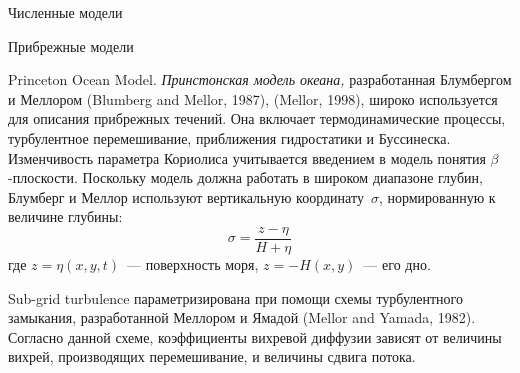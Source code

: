\begin{chapter}{Численные модели}
\begin{section}{Прибрежные модели}
\begin{paragraph}{Princeton Ocean Model.}%
\emph{Принстонская модель океана,}
разработанная Блумбергом и Меллором (Blumberg and Mellor, 1987), (Mellor, 1998),
широко используется для описания прибрежных течений. Она включает 
термодинамические процессы, турбулентное 
перемешивание, приближения 
гидростатики и Буссинеска. 
Изменчивость параметра Кориолиса учитывается 
введением в модель понятия $\beta$-плоскости. Поскольку модель должна работать 
в широком диапазоне глубин, Блумберг и Меллор используют вертикальную
координату~$\sigma$, нормированную к величине глубины:
\begin{equation}
 \sigma = \frac{z-\eta}{H+\eta}
\end{equation}
где $z=\eta(x, y, t)$~--- поверхность моря, $z=-H(x,y)$~--- его дно.
%

Sub-grid turbulence
параметризирована при помощи схемы турбулентного замыкания, разработанной
Меллором и Ямадой (Mellor and Yamada, 1982). Согласно данной схеме, 
коэффициенты вихревой диффузии зависят от величины вихрей, производящих
перемешивание,
и величины сдвига потока.
%


\end{paragraph}
\end{section}
\end{chapter}
